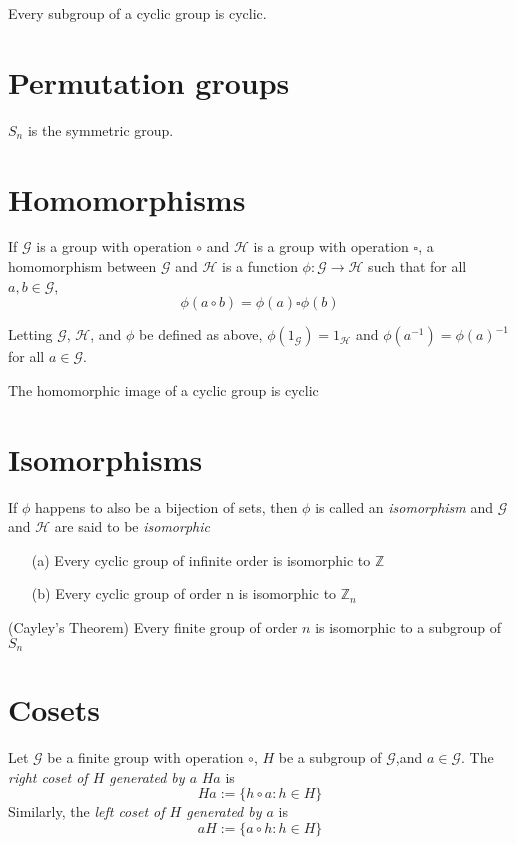\theorem
Every subgroup of a cyclic group is cyclic.


\section{Permutation groups}

$S_n$ is the symmetric group.


\section{Homomorphisms}

If $\mathcal{G}$ is a group with operation $\circ$ and $\mathcal{H}$ is a group with operation $\square$, a homomorphism between $\mathcal{G}$ and $\mathcal{H}$ is a function $\phi: \mathcal{G} \to \mathcal{H}$ such that for all $a, b \in \mathcal{G}$,
\[\phi(a \circ b) = \phi(a) \square \phi(b)\]

\theorem
Letting $\mathcal{G}$, $\mathcal{H}$, and $\phi$ be defined as above, $\phi(1_\mathcal{G}) = 1_\mathcal{H}$ and $\phi(a^{-1}) = \phi(a)^{-1}$ for all $a \in \mathcal{G}$.

\theorem
The homomorphic image of a cyclic group is cyclic


\section{Isomorphisms}

If $\phi$ happens to also be a bijection of sets, then $\phi$ is called an \textit{isomorphism} and $\mathcal{G}$ and $\mathcal{H}$ are said to be \textit{isomorphic}

\theorem
\begin{itemize}
    \item[(a)]
        Every cyclic group of infinite order is isomorphic to $\mathbb{Z}$
    \item[(b)]
        Every cyclic group of order n is isomorphic to $\mathbb{Z}_n$
\end{itemize}

\theorem (Cayley's Theorem)
Every finite group of order $n$ is isomorphic to a subgroup of $S_n$


\section{Cosets}

Let $\mathcal{G}$ be a finite group with operation $\circ$, $H$ be a subgroup of $\mathcal{G}$,and $a \in \mathcal{G}$. The \textit{right coset of $H$ generated by $a$} $Ha$ is
\[Ha := \{h \circ a : h \in H\}\]
Similarly, the \textit{left coset of $H$ generated by $a$} is
\[aH := \{a \circ h : h \in H\}\]

